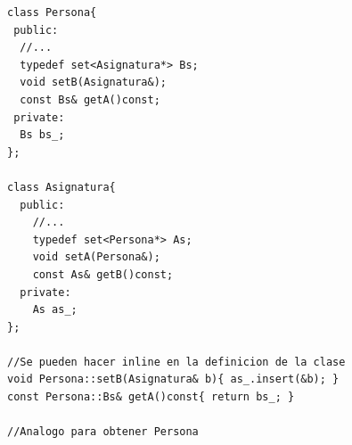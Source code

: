 \begin{center}
	\begin{lstlisting}[frame=single]
class Persona{
 public:
  //...
  typedef set<Asignatura*> Bs;
  void setB(Asignatura&);
  const Bs& getA()const;
 private:
  Bs bs_; 
};

class Asignatura{
  public:
    //...
    typedef set<Persona*> As;
    void setA(Persona&);
    const As& getB()const;
  private:
    As as_;
};

//Se pueden hacer inline en la definicion de la clase
void Persona::setB(Asignatura& b){ as_.insert(&b); }
const Persona::Bs& getA()const{ return bs_; }

//Analogo para obtener Persona
\end{lstlisting}
\end{center}

